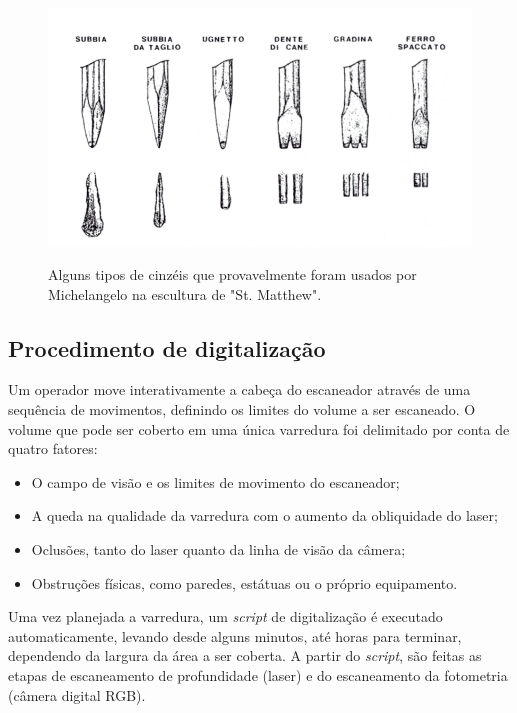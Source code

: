 
\begin{figure}[!h]
	\centering
	\caption{%
		Alguns tipos de cinzéis que provavelmente foram usados por Michelangelo na escultura de "St. Matthew".
	}
	\includegraphics[width=0.5\linewidth]{figs/ferramentasMich.png}
	\label{fig:cinzeis}
\end{figure}

\subsection{Procedimento de digitalização}

Um operador move interativamente a cabeça do escaneador através de uma
sequência de movimentos, definindo os limites do volume a ser escaneado. O
volume que pode ser coberto em uma única varredura foi delimitado por conta de
quatro fatores:
\begin{itemize}
\item{O campo de visão e os limites de movimento do escaneador;}
\item{A  queda na qualidade da varredura com o aumento da obliquidade do laser;}
\item{Oclusões, tanto do laser quanto da linha de visão da câmera;}
\item{Obstruções físicas, como paredes, estátuas ou o próprio equipamento.}
\end{itemize}

Uma vez planejada a varredura, um \emph{script} de digitalização é executado
automaticamente, levando desde alguns minutos, até horas para terminar,
dependendo da largura da área a ser coberta.  A partir do \emph{script}, são feitas as
etapas de escaneamento de profundidade (laser) e do escaneamento da fotometria
(câmera digital RGB).

